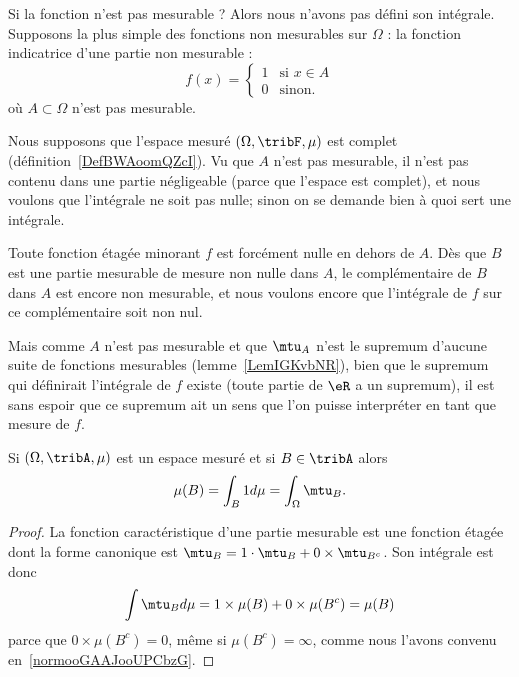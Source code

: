 \begin{normaltext}      \label{NORMooXTGBooKDnAhZ}
    Si la fonction n'est pas mesurable ? Alors nous n'avons pas défini son intégrale. Supposons la plus simple des fonctions non mesurables sur \( \Omega\) : la fonction indicatrice d'une partie non mesurable :
    \begin{equation}
        f(x)=\begin{cases}
            1    &   \text{si } x\in A\\
            0    &    \text{sinon. }
        \end{cases}
    \end{equation}
    où \( A\subset \Omega\) n'est pas mesurable.

    Nous supposons que l'espace mesuré \( (\Omega,\tribF,\mu)\) est complet (définition~\ref{DefBWAoomQZcI}). Vu que \( A\) n'est pas mesurable, il n'est pas contenu dans une partie négligeable (parce que l'espace est complet), et nous voulons que l'intégrale ne soit pas nulle; sinon on se demande bien à quoi sert une intégrale.

    Toute fonction étagée minorant \( f\) est forcément nulle en dehors de \( A\). Dès que \( B\) est une partie mesurable de mesure non nulle dans \( A\), le complémentaire de \( B\) dans \( A\) est encore non mesurable, et nous voulons encore que l'intégrale de \( f\) sur ce complémentaire soit non nul.

    Mais comme \( A\) n'est pas mesurable et que \( \mtu_A\) n'est le supremum d'aucune suite de fonctions mesurables (lemme~\ref{LemIGKvbNR}), bien que le supremum qui définirait l'intégrale de \( f\) existe (toute partie de \( \eR\) a un supremum), il est sans espoir que ce supremum ait un sens que l'on puisse interpréter en tant que mesure de \( f\).
\end{normaltext}

\begin{lemma}       \label{LemooPJLNooVKrBhN}
    Si \( (\Omega,\tribA,\mu)\) est un espace mesuré et si \( B\in \tribA\) alors
    \begin{equation}
        \mu(B)=\int_B1d\mu=\int_{\Omega}\mtu_B.
    \end{equation}
\end{lemma}

\begin{proof}
    La fonction caractéristique d'une partie mesurable est une fonction étagée dont la forme canonique est \( \mtu_B=1\cdot \mtu_B+0\times \mtu_{B^c}\). Son intégrale est donc
    \begin{equation}
        \int\mtu_Bd\mu=1\times \mu(B)+0\times \mu(B^c)=\mu(B)
    \end{equation}
    parce que \( 0\times \mu(B^c)=0\), même si \( \mu(B^c)=\infty\), comme nous l'avons convenu en~\ref{normooGAAJooUPCbzG}.
\end{proof}

